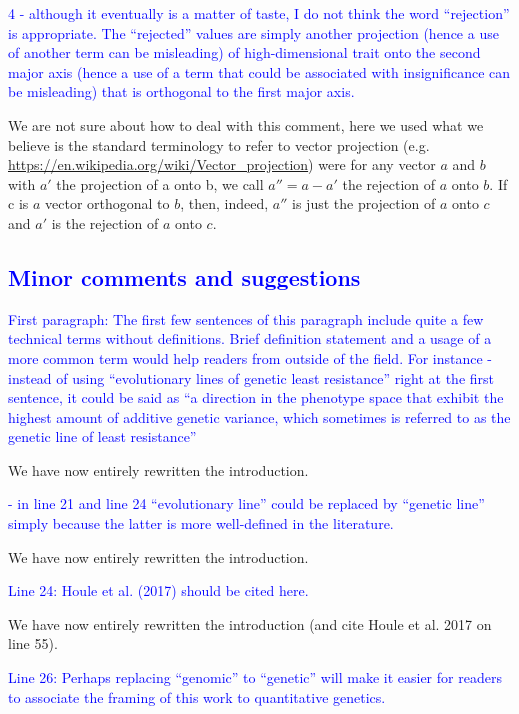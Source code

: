 \documentclass[12pt,letterpaper]{article}
\begin{document}
{\textcolor{blue}{4 - although it eventually is a matter of taste, I do not think the word “rejection” is appropriate. The “rejected” values are simply another projection (hence a use of another term can be misleading) of high-dimensional trait onto the second major axis (hence a use of a term that could be associated with insignificance can be misleading) that is orthogonal to the first major axis.}

We are not sure about how to deal with this comment, here we used what we believe is the standard terminology to refer to vector projection (e.g. \url{https://en.wikipedia.org/wiki/Vector_projection}) were for any vector $a$ and $b$ with $a'$ the projection of a onto b, we call $a'' = a - a'$ the rejection of $a$ onto $b$. If c is $a$ vector orthogonal to $b$, then, indeed, $a''$ is just the projection of $a$ onto $c$ and $a'$ is the rejection of $a$ onto $c$.

\subsection*{\textcolor{blue}{Minor comments and suggestions}}

\textcolor{blue}{First paragraph: The first few sentences of this paragraph include quite a few technical terms without definitions. Brief definition statement and a usage of a more common term would help readers from outside of the field. For instance
- instead of using “evolutionary lines of genetic least resistance” right at the first sentence, it could be said as “a direction in the phenotype space that exhibit the highest amount of additive genetic variance, which sometimes is referred to as the genetic line of least resistance”}

We have now entirely rewritten the introduction.

\textcolor{blue}{- in line 21 and line 24 “evolutionary line” could be replaced by “genetic line” simply because the latter is more well-defined in the literature.}

We have now entirely rewritten the introduction.

\textcolor{blue}{Line 24: Houle et al. (2017) should be cited here.}

We have now entirely rewritten the introduction (and cite Houle et al. 2017 on line 55).

\textcolor{blue}{Line 26: Perhaps replacing “genomic” to “genetic” will make it easier for readers to associate the framing of this work to quantitative genetics.}

}
\end{document}
